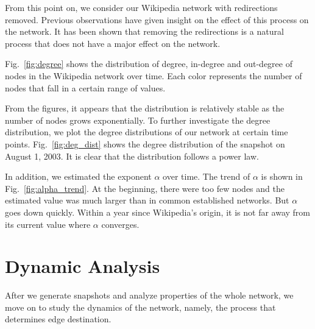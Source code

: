 \documentclass[10pt,twocolumn]{article}
\begin{document}
From this point on, we consider our Wikipedia network with redirections removed. Previous observations have given insight on the effect of this process on the network. It has been shown that removing the redirections is a natural process that does not have a major effect on the network.

Fig.~\ref{fig:degree} shows the distribution of degree, in-degree and out-degree of nodes in the Wikipedia network over time. Each color represents the number of nodes that fall in a certain range of values. 

From the figures, it appears that the distribution is relatively stable as the number of nodes grows exponentially. To further investigate the degree distribution, we plot the degree distributions of our network at certain time points. Fig.~\ref{fig:deg_dist} shows the degree distribution of the snapshot on August 1, 2003. It is clear that the distribution follows a power law. 

In addition, we estimated the exponent $\alpha$ over time. The trend of $\alpha$ is shown in Fig.~\ref{fig:alpha_trend}. At the beginning, there were too few nodes and the estimated value was much larger than in common established networks. But $\alpha$ goes down quickly. Within a year since Wikipedia's origin, it is not far away from its current value where $\alpha$ converges.

\section{Dynamic Analysis}
After we generate snapshots and analyze properties of the whole network, we move on to study the dynamics of the network, namely, the process that determines edge destination.
\end{document}
